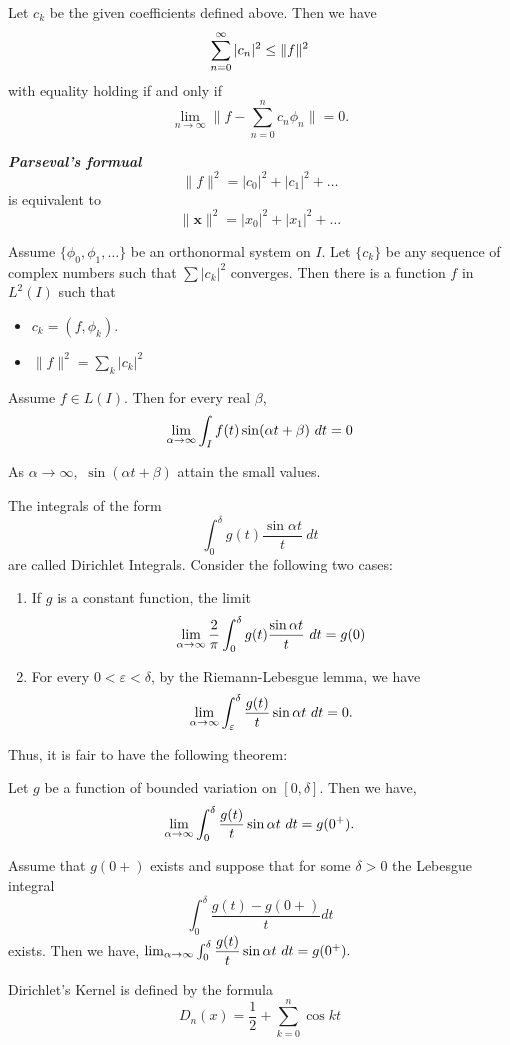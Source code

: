 \documentclass[10pt,a4paper]{book}
\begin{document}
\begin{Thm}
Let $c_k$ be the given coefficients defined above. Then we have
$$\sinf[n]0 |c_n|^2 \leq \lVert f \rVert^2$$
with equality holding if and only if
$$\lim_{n \to \infty}\bigg \lVert f - \sum_{n= 0}^n c_n\phi_n \bigg \rVert = 0.$$
\end{Thm}
\PP \textit{\textbf{Parseval's formual}}
$$\lVert f \rVert^2 = |c_0|^2 + |c_1|^2 + \dots $$
is equivalent to
$$\lVert \mathbf{x} \rVert^2 = |x_0|^2 + |x_1|^2 + \dots $$
\begin{Thm}
Assume $\{\phi_0, \phi_1,\dots\}$ be an orthonormal system  on $I$. Let $\{c_k\}$ be any sequence of complex numbers such that $\sum |c_k|^2$ converges. Then there is a function $f$ in $L^2(I)$ such that
\begin{itemize}
    \item $c_k = (f, \phi_k).$
    \item $\lVert f \rVert^2 = \sum_k |c_k|^2$
\end{itemize}
\end{Thm}
\begin{Thm}
Assume $f \in L(I)$. Then for every real $\beta$,
$$\linf[\alpha] \int_I f(t)\sin(\alpha t + \beta)\ dt = 0$$
\end{Thm}
\PP As $\alpha \to \infty,$ $\sin(\alpha t + \beta)$ attain the small values.

The integrals of the form
$$\int_0^\delta g(t)\dfrac{\sin \alpha t}t\  dt$$
are called Dirichlet Integrals. Consider the following two cases:
\begin{enumerate}
\item If $g$ is a constant function, the limit
$$\linf[\alpha] \frac{2}\pi\int_0^\delta g(t) \dfrac{\sin \alpha t}t\  dt = g(0)$$ 
\item For every $0 < \varepsilon < \delta$, by the Riemann-Lebesgue lemma, we have
$$\linf[\alpha] \int_\varepsilon^\delta \dfrac{g(t)}t \sin \alpha t \ dt = 0.$$
\end{enumerate}
Thus, it is fair to have the following theorem:
\begin{Thm}[Jordan]
Let $g$ be a function of bounded variation on $[0, \delta]$. Then we have,
$$\linf[\alpha] \int_0^\delta \dfrac{g(t)}t \sin \alpha t \ dt = g(0^+).$$
\end{Thm}
\begin{Thm}[Dini]
Assume that $g(0+)$ exists and suppose that for some $\delta > 0$
the Lebesgue integral
$$\int_{0}^\delta \dfrac{g(t) -g(0+)}{t}dt$$
exists. Then we have,
$\linf[\alpha] \int_0^\delta \dfrac{g(t)}t \sin \alpha t \ dt = g(0^+).$
\end{Thm}
Dirichlet's Kernel is defined by the formula
$$D_n(x) = \frac{1}2 + \sum_{k = 0}^n \cos kt$$
\end{document}
